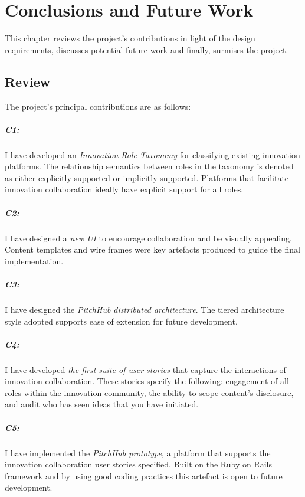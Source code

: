 \chapter{Conclusions and Future Work}
This chapter reviews the project's contributions in light of the design requirements, discusses potential future work and finally, surmises the project.

\section{Review}\label{S:review}

The project's principal contributions are as follows:

\paragraph{C1:} I have developed an {\em Innovation Role Taxonomy} for classifying existing innovation platforms. The relationship semantics between roles in the taxonomy is denoted as either explicitly supported or implicitly supported. Platforms that facilitate innovation collaboration ideally have explicit support for all roles.

\paragraph{C2:} I have designed a {\em new UI} to encourage collaboration and be visually appealing. Content templates and wire frames were key artefacts produced to guide the final implementation.

\paragraph{C3:} I have designed the {\em PitchHub distributed architecture}. The tiered architecture style adopted supports ease of extension for future development.

\paragraph{C4:} I have developed {\em the first suite of user stories} that capture the interactions of innovation collaboration. These stories specify the following: engagement of all roles within the innovation community, the ability to scope content's disclosure, and audit who has seen ideas that you have initiated.

\paragraph{C5:} I have implemented the {\em PitchHub prototype}, a platform that supports the innovation collaboration user stories specified. Built on the Ruby on Rails framework and by using good coding practices this artefact is open to future development.

